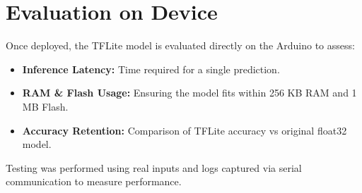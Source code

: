 \section{Evaluation on Device}

Once deployed, the TFLite model is evaluated directly on the Arduino to assess:

\begin{itemize}
\item \textbf{Inference Latency:} Time required for a single prediction.
\item \textbf{RAM \& Flash Usage:} Ensuring the model fits within 256 KB RAM and 1 MB Flash.
\item \textbf{Accuracy Retention:} Comparison of TFLite accuracy vs original float32 model.
\end{itemize}

Testing was performed using real inputs and logs captured via serial communication to measure performance.
